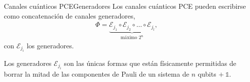 \documentclass[xcolor=dvipsnames,presentation]{beamer}%
\begin{document}
%
%





\begin{frame}{Canales cuánticos PCE}{Generadores}
Los canales cuánticos PCE pueden escribirse como concatenación 
de canales generadores,
\begin{align*}
\Phi = \underbrace{\mathcal{E}_{j_1}\circ \mathcal{E}_{j_2}\circ \ldots
\circ \mathcal{E}_{j_l}}_{\text{máximo }2^n},
\end{align*}
con $\mathcal{E}_{j_i}$ los generadores.

\vfill

Los generadores $\mathcal{E}_{j_i}$ son las únicas formas que están 
físicamente permitidas de borrar la mitad de las componentes de Pauli 
de un sistema de $n$ qubits $+\ \mathds{1}$.
\end{frame}
\end{document}
